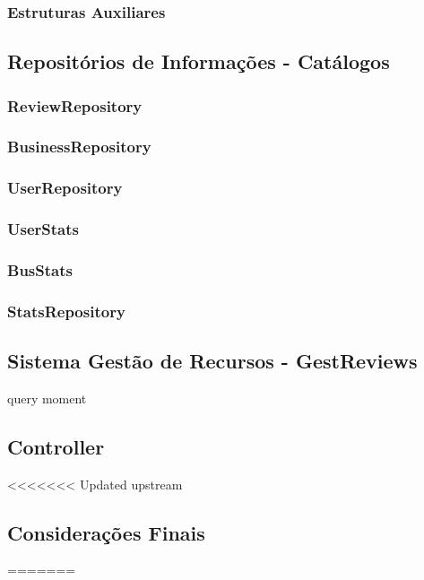 \documentclass[11pt]{article}
\begin{document}
\subsubsection{Estruturas Auxiliares}

\subsection{Repositórios de Informações - Catálogos}

\subsubsection{ReviewRepository}

\subsubsection{BusinessRepository}

\subsubsection{UserRepository}

\subsubsection{UserStats}

\subsubsection{BusStats}

\subsubsection{StatsRepository}

\subsection{Sistema Gestão de Recursos - GestReviews}

query moment

\subsection{Controller}

<<<<<<< Updated upstream
\subsection{Considerações Finais}
=======
\end{document}
